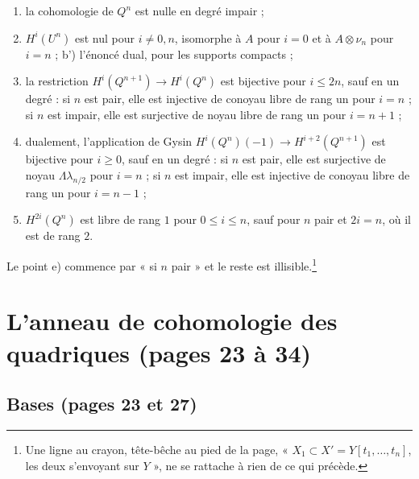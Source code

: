 \documentclass[11pt,a4paper]{article}
\begin{document}
\begin{enumerate}
\item[a)] la cohomologie de $Q^{n}$ est nulle en degré impair ;
\item[b)] $H^{i}(U^{n})$ est nul pour $i \neq 0, n$, isomorphe à $A$ pour
$i = 0$ et à $A \otimes \nu_{n}$ pour $i = n$ ; b') l'énoncé dual, pour les
supports compacts ;
\item[c)] la restriction $H^{i}(Q^{n+1}) \to H^{i}(Q^{n})$ est bijective
pour $i \leq 2n$, sauf en un degré : si $n$ est pair, elle est injective de
conoyau libre de rang un pour $i = n$ ; si $n$ est impair, elle est
surjective de noyau libre de rang un pour $i = n + 1$ ;
\item[c')] dualement, l'application de Gysin
$H^{i}(Q^{n})(-1) \to H^{i+2}(Q^{n+1})$ est bijective pour $i \geq 0$, sauf
en un degré : si $n$ est pair, elle est surjective de noyau
$\Lambda\lambda_{n/2}$ pour $i = n$ ; si $n$ est impair, elle est injective
de conoyau libre de rang un pour $i = n - 1$ ;
\item[d)] $H^{2i}(Q^{n})$ est libre de rang $1$ pour $0 \leq i \leq n$, sauf
pour $n$ pair et $2i = n$, où il est de rang $2$.
\end{enumerate}

Le
point e) commence par « si $n$ pair » et le reste est
illisible.\footnote{Une ligne au crayon, tête-bêche au pied de la page,
« $X_{1} \subset X' = Y[t_{1}, \ldots, t_{n}]$, les deux s'envoyant sur
$Y$ », ne se rattache à rien de ce qui précède.}

\section*{L'anneau de cohomologie des quadriques (pages 23 à 34)}

\subsection*{Bases (pages 23 et 27)}
\end{document}
